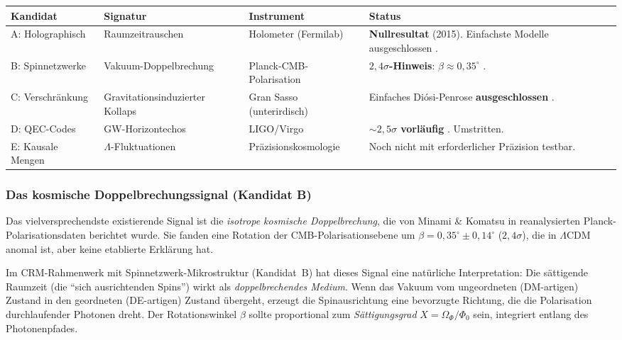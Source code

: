 \documentclass[11pt,a4paper]{article}
\begin{document}
\begin{center}
\small
\begin{tabular}{lllp{3.4cm}}
\toprule
\textbf{Kandidat} & \textbf{Signatur} & \textbf{Instrument} & \textbf{Status} \\
\midrule
A: Holographisch & Raumzeitrauschen & Holometer (Fermilab) & \textbf{Nullresultat} (2015). Einfachste Modelle ausgeschlossen \cite{Chou2017}. \\
B: Spinnetzwerke & Vakuum-Doppelbrechung & Planck-CMB-Polarisation & \textbf{$2{,}4\sigma$-Hinweis}: $\beta \approx 0{,}35^\circ$ \cite{Minami2020}. \\
C: Verschr\"ankung & Gravitationsinduzierter Kollaps & Gran Sasso (unterirdisch) & Einfaches Di\'osi-Penrose \textbf{ausgeschlossen} \cite{Donadi2021}. \\
D: QEC-Codes & GW-Horizontechos & LIGO/Virgo & \textbf{$\sim2{,}5\sigma$ vorl\"aufig} \cite{Abedi2017}. Umstritten. \\
E: Kausale Mengen & $\Lambda$-Fluktuationen & Pr\"azisionskosmologie & Noch nicht mit erforderlicher Pr\"azision testbar. \\
\bottomrule
\end{tabular}
\end{center}

\subsubsection{Das kosmische Doppelbrechungssignal (Kandidat B)}

Das vielversprechendste existierende Signal ist die \textit{isotrope kosmische Doppelbrechung}, die von Minami \& Komatsu \cite{Minami2020} in reanalysierten Planck-Polarisationsdaten berichtet wurde. Sie fanden eine Rotation der CMB-Polarisationsebene um $\beta = 0{,}35^\circ \pm 0{,}14^\circ$ ($2{,}4\sigma$), die in $\Lambda$CDM anomal ist, aber keine etablierte Erkl\"arung hat.

Im CRM-Rahmenwerk mit Spinnetzwerk-Mikrostruktur (Kandidat~B) hat dieses Signal eine nat\"urliche Interpretation: Die s\"attigende Raumzeit (die "`sich ausrichtenden Spins"') wirkt als \textit{doppelbrechendes Medium}. Wenn das Vakuum vom ungeordneten (DM-artigen) Zustand in den geordneten (DE-artigen) Zustand \"ubergeht, erzeugt die Spinausrichtung eine bevorzugte Richtung, die die Polarisation durchlaufender Photonen dreht. Der Rotationswinkel $\beta$ sollte proportional zum \textit{S\"attigungsgrad} $X = \Omega_\Phi/\Phi_0$ sein, integriert entlang des Photonenpfades.
\end{document}
